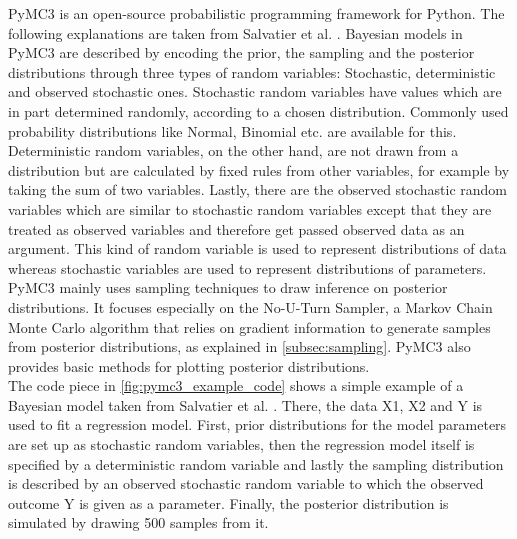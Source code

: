 \documentclass{article}
\begin{document}
PyMC3 is an open-source probabilistic programming framework for Python. The following explanations are taken from Salvatier et al. \cite{Salvatier2016}. Bayesian models in PyMC3 are described by encoding the prior, the sampling and the posterior distributions through three types of random variables: Stochastic, deterministic and observed stochastic ones. Stochastic random variables have values which are in part determined randomly, according to a chosen distribution. Commonly used probability distributions like Normal, Binomial etc. are available for this. Deterministic random variables, on the other hand, are not drawn from a distribution but are calculated by fixed rules from other variables, for example by taking the sum of two variables. Lastly, there are the observed stochastic random variables which are similar to stochastic random variables except that they are treated as observed variables and therefore get passed observed data as an argument. This kind of random variable is used to represent distributions of data whereas stochastic variables are used to represent distributions of parameters.
\\
PyMC3 mainly uses sampling techniques to draw inference on posterior distributions. It focuses especially on the No-U-Turn Sampler, a Markov Chain Monte Carlo algorithm that relies on gradient information to generate samples from posterior distributions, as explained in \autoref{subsec:sampling}. PyMC3 also provides basic methods for plotting posterior distributions.
\\
The code piece in \autoref{fig:pymc3_example_code} shows a simple example of a Bayesian model taken from Salvatier et al. \cite{Salvatier2016}. There, the data X1, X2 and Y is used to fit a regression model. First, prior distributions for the model parameters are set up as stochastic random variables, then the regression model itself is specified by a deterministic random variable and lastly the sampling distribution is described by an observed stochastic random variable to which the observed outcome Y is given as a parameter. Finally, the posterior distribution is simulated by drawing 500 samples from it.
\end{document}

